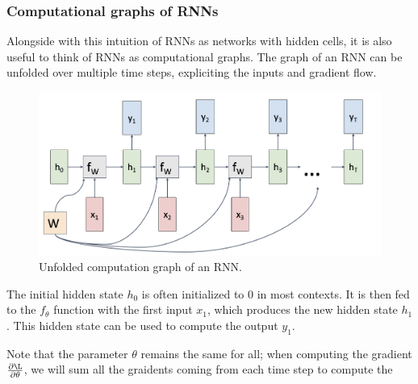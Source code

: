 \subsubsection{Computational graphs of RNNs}
Alongside with this intuition of RNNs as networks with hidden cells, it is also useful to think of RNNs as computational graphs. The graph of an RNN can be unfolded over multiple time steps, expliciting the inputs and gradient flow.
\begin{figure}[H]
    \centering
    \includegraphics[width=.7\textwidth]{images/rnn-graph.png}
    \caption{Unfolded computation graph of an RNN.}
\end{figure}
The initial hidden state $h_0$ is often initialized to 0 in most contexts. It is then fed to the $f_\theta$ function with the first input $x_1$, which produces the new hidden state $h_1$. This hidden state can be used to compute the output $y_1$.

Note that the parameter $\theta$ remains the same for all; when computing the gradient $\frac{\partial\L}{\partial\theta}$, we will sum all the graidents coming from each time step to compute the 

\newpage
